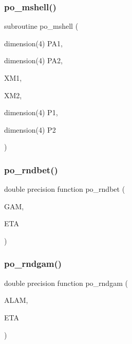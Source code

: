 \mbox{\label{sophia_8f_ad5081f8ab8f8bcc8b16cd0d624b89eb9}} 
\subsubsection{\texorpdfstring{po\+\_\+mshell()}{po\_mshell()}}
{\footnotesize\ttfamily subroutine po\+\_\+mshell (\begin{DoxyParamCaption}\item[{dimension(4)}]{P\+A1,  }\item[{dimension(4)}]{P\+A2,  }\item[{}]{X\+M1,  }\item[{}]{X\+M2,  }\item[{dimension(4)}]{P1,  }\item[{dimension(4)}]{P2 }\end{DoxyParamCaption})}

\mbox{\label{sophia_8f_a9362b6e86899866a31cb99e284e6668c}} 
\subsubsection{\texorpdfstring{po\+\_\+rndbet()}{po\_rndbet()}}
{\footnotesize\ttfamily double precision function po\+\_\+rndbet (\begin{DoxyParamCaption}\item[{}]{G\+AM,  }\item[{}]{E\+TA }\end{DoxyParamCaption})}

\mbox{\label{sophia_8f_af30a5e7351ea97fc265bbf22a0e99b8e}} 
\subsubsection{\texorpdfstring{po\+\_\+rndgam()}{po\_rndgam()}}
{\footnotesize\ttfamily double precision function po\+\_\+rndgam (\begin{DoxyParamCaption}\item[{}]{A\+L\+AM,  }\item[{}]{E\+TA }\end{DoxyParamCaption})}

